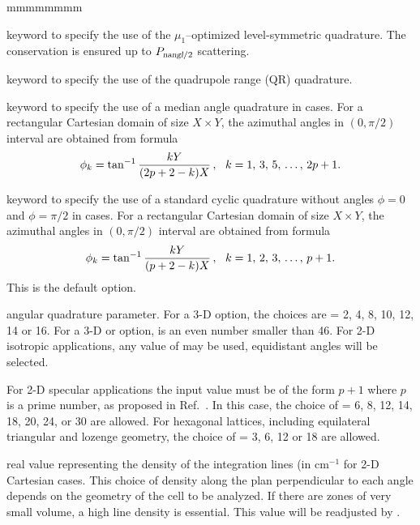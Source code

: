 \begin{ListeDeDescription}{mmmmmmmm}
\item[\moc{LSN}] keyword to specify the use of the $\mu_1$--optimized level-symmetric quadrature. The conservation is ensured up to $P_{\dusa{nangl}/2}$ scattering.

\item[\moc{QRN}] keyword to specify the use of the quadrupole range (QR) quadrature.\cite{quadrupole}

\item[\moc{MEDI}] keyword to specify the use of a median angle quadrature in  cases. For
a rectangular Cartesian domain of size $X \times Y$, the azimuthal angles in $(0,\pi/2)$ interval are obtained from formula
$$
\phi_k=\tan^{-1}{\displaystyle kY\over\displaystyle (2p+2-k)X} \, , \ \ k=1,\, 3,\, 5, \, \dots, \, 2p+1 .
$$

\item[\moc{EQW2}] keyword to specify the use of a standard cyclic quadrature without angles $\phi=0$ and $\phi=\pi/2$ in  cases. For
a rectangular Cartesian domain of size $X \times Y$, the azimuthal angles in $(0,\pi/2)$ interval are obtained from formula
$$
\phi_k=\tan^{-1}{\displaystyle k Y\over\displaystyle (p+2-k)X} \, , \ \ k=1,\, 2,\, 3, \, \dots, \, p+1 .
$$
This is the default option.

\item[\dusa{nangl}] angular quadrature parameter. For a 3-D  option, the choices are  = 2, 4, 8, 10, 12, 14 
or 16. For a 3-D  or  option,  is an even number smaller than 46.\cite{ige260} For 2-D 
isotropic applications, any value of  may be used, equidistant angles will be selected.

For 2-D specular applications the input value must be of the form $p + 1$ where $p$ is a prime number, as proposed
in Ref.~. In this case, the choice of  = 6, 8, 12, 14, 18, 20, 24, or 30 are allowed. For hexagonal lattices,
including equilateral triangular and lozenge geometry, the choice of  = 3, 6, 12 or 18 are allowed.

\item[\dusa{dens}] real value representing the density of the integration lines (in cm$^{-1}$ for 2-D Cartesian cases.
This choice of density along the plan perpendicular to each angle depends on the geometry of the cell to be analyzed. If there 
are zones of very small volume, a high line density is essential. This value will be readjusted by 
.


\end{ListeDeDescription}
